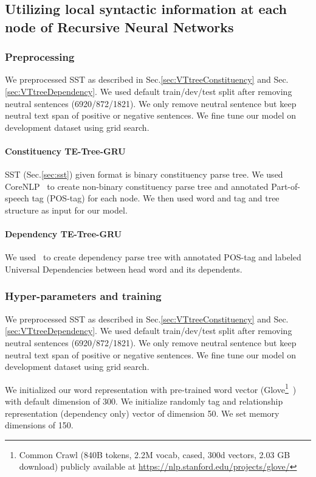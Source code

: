 \subsection{Utilizing local syntactic information at each node of Recursive Neural Networks}
\subsubsection{Preprocessing}
We preprocessed SST as described in Sec.\ref{sec:VTtreeConstituency} and Sec.\ref{sec:VTtreeDependency}. We used default train/dev/test split after removing neutral sentences (6920/872/1821). We only remove neutral sentence but keep neutral text span of positive or negative sentences. We fine tune our model on development dataset using grid search.

\paragraph{Constituency TE-Tree-GRU}
SST (Sec.\ref{sec:sst}) given format is binary constituency parse tree. 
We used CoreNLP~\cite{manning2014stanford} to create non-binary constituency parse tree and annotated Part-of-speech tag (POS-tag) for each node. We then used word and tag and tree structure as input for our model.

\paragraph{Dependency TE-Tree-GRU}
We used~\cite{manning2014stanford} to create dependency parse tree with annotated POS-tag and labeled Universal Dependencies between head word and its dependents.


\subsubsection{Hyper-parameters and training}
We preprocessed SST as described in Sec.\ref{sec:VTtreeConstituency} and Sec.\ref{sec:VTtreeDependency}. We used default train/dev/test split after removing neutral sentences (6920/872/1821). We only remove neutral sentence but keep neutral text span of positive or negative sentences. We fine tune our model on development dataset using grid search.

We initialized our word representation with pre-trained word vector (Glove\footnote{Common Crawl (840B tokens, 2.2M vocab, cased, 300d vectors, 2.03 GB download) publicly available at \url{https://nlp.stanford.edu/projects/glove/}}~\cite{glove})  with default dimension of 300.  We initialize randomly tag and relationship representation (dependency only) vector of dimension 50. We set memory dimensions of 150.

